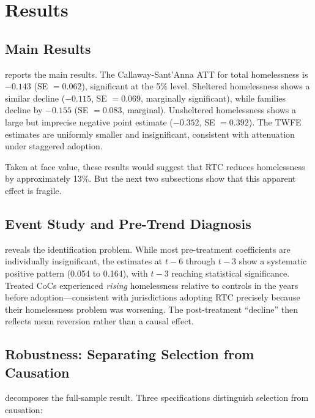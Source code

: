 \documentclass[12pt]{article}
\begin{document}
\section{Results}
\label{sec:results}

\subsection{Main Results}



 reports the main results. The Callaway-Sant'Anna ATT for total homelessness is $-0.143$ (SE $= 0.062$), significant at the 5\% level. Sheltered homelessness shows a similar decline ($-0.115$, SE $= 0.069$, marginally significant), while families decline by $-0.155$ (SE $= 0.083$, marginal). Unsheltered homelessness shows a large but imprecise negative point estimate ($-0.352$, SE $= 0.392$). The TWFE estimates are uniformly smaller and insignificant, consistent with attenuation under staggered adoption.

Taken at face value, these results would suggest that RTC reduces homelessness by approximately 13\%. But the next two subsections show that this apparent effect is fragile.

\subsection{Event Study and Pre-Trend Diagnosis}



 reveals the identification problem. While most pre-treatment coefficients are individually insignificant, the estimates at $t-6$ through $t-3$ show a systematic positive pattern (0.054 to 0.164), with $t-3$ reaching statistical significance. Treated CoCs experienced \textit{rising} homelessness relative to controls in the years before adoption---consistent with jurisdictions adopting RTC precisely because their homelessness problem was worsening. The post-treatment ``decline'' then reflects mean reversion rather than a causal effect.

\subsection{Robustness: Separating Selection from Causation}



 decomposes the full-sample result. Three specifications distinguish selection from causation:
\end{document}
